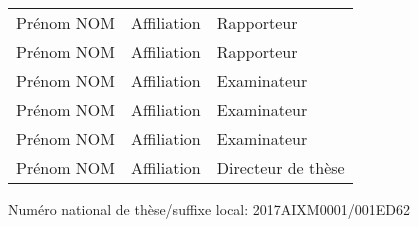 \vspace{0.4cm}
\begin{tabular}{lll}
	Prénom NOM & Affiliation & Rapporteur \\
    \vspace{0.08cm}
	Prénom NOM & Affiliation & Rapporteur \\
    \vspace{0.08cm}
	Prénom NOM & Affiliation & Examinateur \\
    \vspace{0.08cm}
	Prénom NOM & Affiliation & Examinateur \\
    \vspace{0.08cm}
	Prénom NOM & Affiliation & Examinateur \\
    \vspace{0.08cm}
	Prénom NOM & Affiliation & Directeur de thèse \\
\end{tabular}

\vspace{0.4cm}
\begin{flushleft}\normalsize Numéro national de thèse/suffixe local: 2017AIXM0001/001ED62\\\end{flushleft}
\selectfont{}
